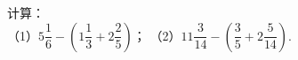计算：\\
（1）$5\dfrac {1}{6}-\left(1\dfrac {1}{3}+2\dfrac {2}{5}\right)$；\hspace{4cm}
（2）$11\dfrac {3}{14}-\left(\dfrac {3}{5}+2\dfrac {5}{14}\right)$.